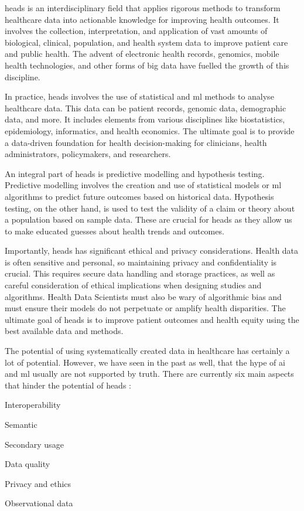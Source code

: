 
\ac{heads} is an interdisciplinary field that applies rigorous methods to transform healthcare data into actionable knowledge for improving health outcomes. It involves the collection, interpretation, and application of vast amounts of biological, clinical, population, and health system data to improve patient care and public health. The advent of electronic health records, genomics, mobile health technologies, and other forms of big data have fuelled the growth of this discipline.

In practice, \ac{heads} involves the use of statistical and \ac{ml} methods to analyse healthcare data. This data can be patient records, genomic data, demographic data, and more. It includes elements from various disciplines like biostatistics, epidemiology, informatics, and health economics. The ultimate goal is to provide a data-driven foundation for health decision-making for clinicians, health administrators, policymakers, and researchers.

An integral part of \ac{heads} is predictive modelling and hypothesis testing. Predictive modelling involves the creation and use of statistical models or \ac{ml} algorithms to predict future outcomes based on historical data. Hypothesis testing, on the other hand, is used to test the validity of a claim or theory about a population based on sample data. These are crucial for \ac{heads} as they allow us to make educated guesses about health trends and outcomes.

Importantly, \ac{heads} has significant ethical and privacy considerations. Health data is often sensitive and personal, so maintaining privacy and confidentiality is crucial. This requires secure data handling and storage practices, as well as careful consideration of ethical implications when designing studies and algorithms. Health Data Scientists must also be wary of algorithmic bias and must ensure their models do not perpetuate or amplify health disparities. The ultimate goal of \ac{heads} is to improve patient outcomes and health equity using the best available data and methods.


The potential of using systematically created data in healthcare has certainly a lot of potential. However, we have seen in the past as well, that the hype of \ac{ai} and \ac{ml} usually are not supported by truth. There are currently six main aspects that hinder the potential of \ac{heads} \cite{panchInconvenientTruthAI2019,peekThreeControversiesHealth2018}:
\begin{myitemize}
    \item Interoperability
    \item Semantic
    \item Secondary usage
    \item Data quality
    \item Privacy and ethics
    \item Observational data
\end{myitemize}

